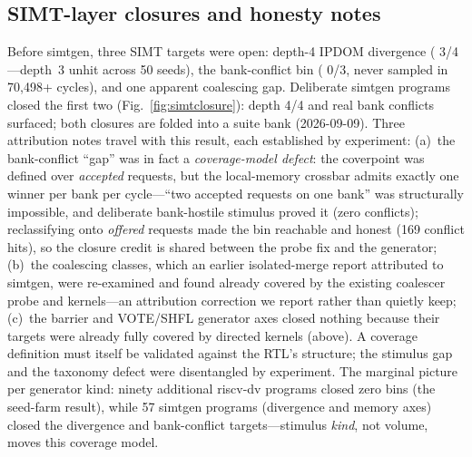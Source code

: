 \documentclass[conference]{IEEEtran}
\newcommand{\code}[1]{\texttt{\detokenize{#1}}}
\begin{document}
\subsection{SIMT-layer closures and honesty notes}
Before simtgen, three SIMT targets were open: depth-4 IPDOM divergence
(\code{cp_split_depth} 3/4---depth~3 unhit across 50 seeds), the
bank-conflict bin (\code{lmem_bank_cg} 0/3, never sampled in
70{,}498+ cycles), and one apparent coalescing gap. Deliberate simtgen
programs closed the first two (Fig.~\ref{fig:simtclosure}): depth 4/4
and real bank conflicts surfaced; both closures are folded into a
suite bank (2026-09-09). Three attribution notes travel with this
result, each established by experiment: (a)~the bank-conflict
``gap'' was in fact a \emph{coverage-model defect}: the
coverpoint was defined over \emph{accepted} requests, but the
local-memory crossbar admits exactly one winner per bank per
cycle---``two accepted requests on one bank'' was structurally
impossible, and deliberate bank-hostile stimulus proved it (zero
conflicts); reclassifying onto \emph{offered} requests made the bin
reachable and honest (169 conflict hits), so the closure credit is
shared between the probe fix and the generator;
(b)~the coalescing classes, which an earlier isolated-merge report
attributed to simtgen, were re-examined and found already covered by
the existing coalescer probe and kernels---an attribution correction
we report rather than quietly keep; (c)~the barrier and VOTE/SHFL
generator axes closed nothing because their targets were already fully
covered by directed kernels (above). A
coverage definition must itself be validated against the RTL's
structure; the stimulus gap and the taxonomy defect were disentangled
by experiment. The marginal picture per
generator kind: ninety additional riscv-dv
programs closed zero bins (the seed-farm result), while 57 simtgen
programs (divergence and memory axes) closed the divergence and
bank-conflict targets---stimulus
\emph{kind}, not volume, moves this coverage model.
\end{document}
